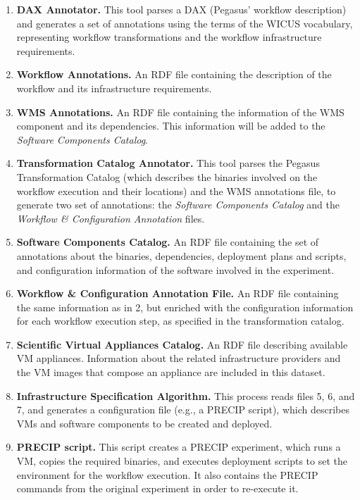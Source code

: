 \begin{enumerate}
	\item \textbf{DAX Annotator.} This tool parses a DAX (Pegasus' workflow description) 
		and generates a set of annotations using the terms of the WICUS vocabulary, 
		representing workflow transformations and the workflow infrastructure requirements.

	\item \textbf{Workflow Annotations.} An RDF file containing the description of the workflow 
		and its infrastructure requirements.

	\item \textbf{WMS Annotations.} An RDF file containing the information of the WMS component 
		and its dependencies. This information will be added to the \emph{Software Components 
		Catalog}.

	\item \textbf{Transformation Catalog Annotator.} This tool parses the Pegasus Transformation 
		Catalog (which describes the binaries involved on the workflow execution and their locations) 
		and the WMS annotations file, to generate two set of annotations: the \emph{Software 
		Components Catalog} and the \emph{Workflow \& Configuration Annotation} files.

	\item \textbf{Software Components Catalog.} An RDF file containing the set of annotations about 
		the binaries, dependencies, deployment plans and scripts, and configuration information of 
		the software involved in the experiment.

	\item \textbf{Workflow \& Configuration Annotation File.} An RDF file containing the same information 
		as in 2, but enriched with the configuration information for each workflow execution step, as 
		specified in the transformation catalog.

	\item \textbf{Scientific Virtual Appliances Catalog.} An RDF file describing available VM appliances. 
		Information about the related infrastructure providers and the VM images that compose an 
		appliance are included in this dataset.

	\item \textbf{Infrastructure Specification Algorithm.} This process reads files 5, 6, and 7, and 
		generates a configuration file (e.g., a PRECIP script), which describes VMs and software 
		components to be created and deployed.

	\item \textbf{PRECIP script.} This script creates a PRECIP experiment, which runs a VM, copies 
		the required binaries, and executes deployment scripts to set the environment for the workflow 
		execution. It also contains the PRECIP commands from the original experiment in order to 
		re-execute it.

\end{enumerate}

